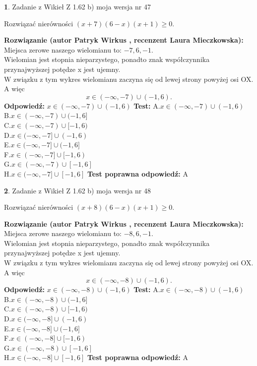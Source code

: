\documentclass[12pt, a4paper]{article}
\theoremstyle{definition} %
\newtheorem{zad}{}
\newcommand{\zadStart}[1]{\begin{zad}#1\newline}
\newcommand{\zadStop}{\end{zad}}
\newcommand{\rozwStart}[2]{\noindent \textbf{Rozwiązanie (autor #1 , recenzent #2): }\newline}
\newcommand{\rozwStop}{\newline}
\newcommand{\odpStart}{\noindent \textbf{Odpowiedź:}\newline}
\newcommand{\odpStop}{\newline}
\newcommand{\testStart}{\noindent \textbf{Test:}\newline}
\newcommand{\testStop}{\newline}
\newcommand{\kluczStart}{\noindent \textbf{Test poprawna odpowiedź:}\newline}
\newcommand{\kluczStop}{\newline}
\begin{document}
\zadStart{Zadanie z Wikieł Z 1.62 b) moja wersja nr 47}

Rozwiązać nierówności $(x+7)(6-x)(x+1)\ge0$.
\zadStop
\rozwStart{Patryk Wirkus}{Laura Mieczkowska}
Miejsca zerowe naszego wielomianu to: $-7, 6, -1$.\\
Wielomian jest stopnia nieparzystego, ponadto znak współczynnika przy\linebreak najwyższej potędze x jest ujemny.\\ W związku z tym wykres wielomianu zaczyna się od lewej strony powyżej osi OX. A więc $$x \in (-\infty,-7) \cup (-1,6).$$
\rozwStop
\odpStart
$x \in (-\infty,-7) \cup (-1,6)$
\odpStop
\testStart
A.$x \in (-\infty,-7) \cup (-1,6)$\\
B.$x \in (-\infty,-7) \cup (-1,6]$\\
C.$x \in (-\infty,-7) \cup [-1,6)$\\
D.$x \in (-\infty,-7] \cup (-1,6)$\\
E.$x \in (-\infty,-7] \cup (-1,6]$\\
F.$x \in (-\infty,-7] \cup [-1,6)$\\
G.$x \in (-\infty,-7) \cup [-1,6]$\\
H.$x \in (-\infty,-7] \cup [-1,6]$
\testStop
\kluczStart
A
\kluczStop



\zadStart{Zadanie z Wikieł Z 1.62 b) moja wersja nr 48}

Rozwiązać nierówności $(x+8)(6-x)(x+1)\ge0$.
\zadStop
\rozwStart{Patryk Wirkus}{Laura Mieczkowska}
Miejsca zerowe naszego wielomianu to: $-8, 6, -1$.\\
Wielomian jest stopnia nieparzystego, ponadto znak współczynnika przy\linebreak najwyższej potędze x jest ujemny.\\ W związku z tym wykres wielomianu zaczyna się od lewej strony powyżej osi OX. A więc $$x \in (-\infty,-8) \cup (-1,6).$$
\rozwStop
\odpStart
$x \in (-\infty,-8) \cup (-1,6)$
\odpStop
\testStart
A.$x \in (-\infty,-8) \cup (-1,6)$\\
B.$x \in (-\infty,-8) \cup (-1,6]$\\
C.$x \in (-\infty,-8) \cup [-1,6)$\\
D.$x \in (-\infty,-8] \cup (-1,6)$\\
E.$x \in (-\infty,-8] \cup (-1,6]$\\
F.$x \in (-\infty,-8] \cup [-1,6)$\\
G.$x \in (-\infty,-8) \cup [-1,6]$\\
H.$x \in (-\infty,-8] \cup [-1,6]$
\testStop
\kluczStart
A
\kluczStop
\end{document}
